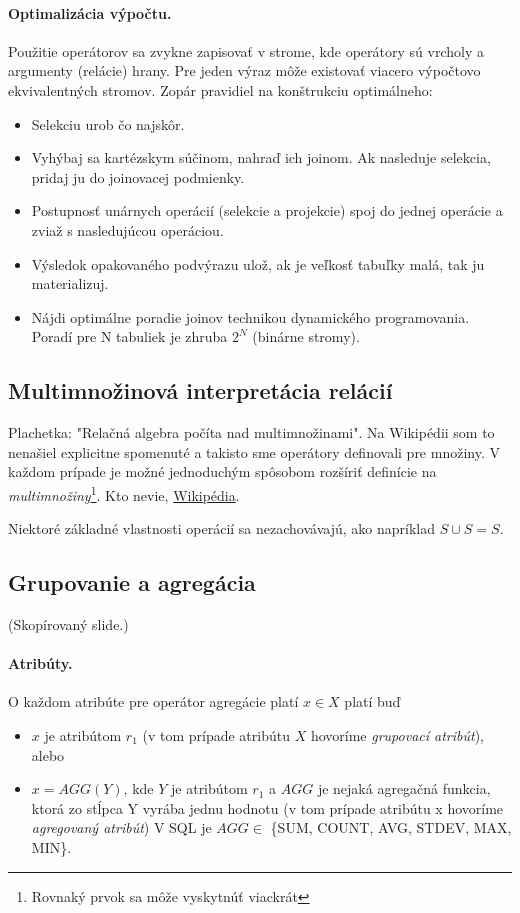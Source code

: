 \documentclass[10pt,a4paper]{article}
\begin{document}
\paragraph{Optimalizácia výpočtu.}
Použitie operátorov sa zvykne zapisovať v strome, kde operátory sú vrcholy a argumenty (relácie) hrany.
Pre jeden výraz môže existovať viacero výpočtovo ekvivalentných stromov.
Zopár pravidiel na konštrukciu optimálneho:
\begin{itemize}
\item Selekciu urob čo najskôr.
\item Vyhýbaj sa kartézskym súčinom, nahraď ich joinom. Ak
nasleduje selekcia, pridaj ju do joinovacej podmienky.
\item Postupnosť unárnych operácií (selekcie a projekcie) spoj do
jednej operácie a zviaž s nasledujúcou operáciou.
\item Výsledok opakovaného podvýrazu ulož, ak je veľkosť tabuľky
malá, tak ju materializuj.
\item Nájdi optimálne poradie joinov technikou dynamického
programovania. Poradí pre N tabuliek je zhruba $2^N$ (binárne stromy).
\end{itemize}

\subsection{Multimnožinová interpretácia relácií}

Plachetka: "Relačná algebra počíta nad multimnožinami". Na Wikipédii som to nenašiel explicitne spomenuté a takisto sme operátory definovali pre množiny. V každom prípade je možné jednoduchým spôsobom rozšíriť definície na \emph{multimnožiny}\footnote{Rovnaký prvok sa môže vyskytnúť viackrát}. Kto nevie, \href{http://en.wikipedia.org/wiki/Multiset}{Wikipédia}.

Niektoré základné vlastnosti operácií sa nezachovávajú, ako napríklad $S \cup S = S$.

\subsection{Grupovanie a agregácia}
\label{rel_alg_agg}
(Skopírovaný slide.)

\paragraph{Atribúty.}
O každom atribúte pre operátor agregácie platí $x \in X$ platí buď
\begin{itemize}
\item $x$ je atribútom $r_1$ (v tom prípade atribútu $X$ hovoríme
        \emph{grupovací atribút}), alebo
\item $x = AGG(Y)$, kde $Y$ je atribútom $r_1$ a $AGG$ je nejaká
     agregačná funkcia, ktorá zo stĺpca Y vyrába jednu hodnotu (v
         tom prípade atribútu x hovoríme \emph{agregovaný atribút})
V SQL je $AGG \in$ \{SUM, COUNT, AVG, STDEV, MAX, MIN\}.
\end{itemize}
\end{document}
